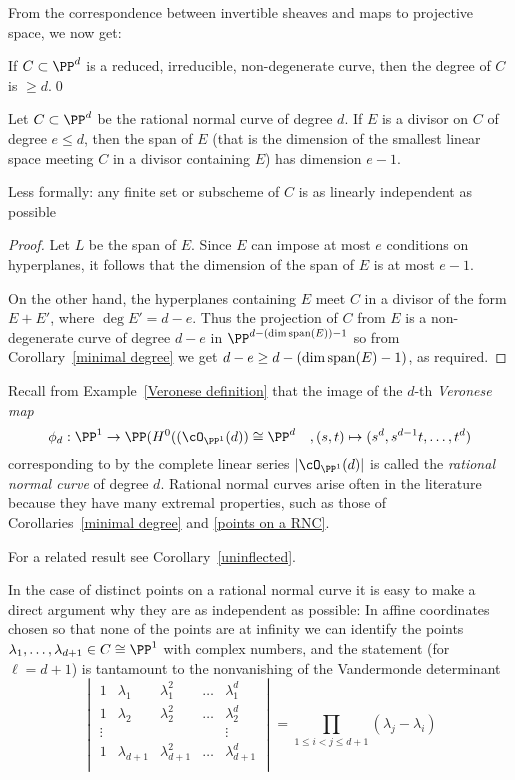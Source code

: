 From the correspondence between invertible sheaves and maps to projective space, we now get:
\begin{corollary}\label{minimal degree}
If $C\subset \PP^d$ is a reduced, irreducible, non-degenerate curve, then the degree of $C$ is $\geq d$.\qed
\end{corollary}

\begin{corollary}\label{independence of points on a RNC}
Let $C\subset \PP^d$ be the rational normal curve of degree $d$. If $E$ is a divisor on $C$ of degree $e\leq d$, then the
span of $E$ (that is the dimension of the smallest linear space meeting $C$ in a divisor containing $E$) has dimension $e-1$.
\end{corollary}
Less formally: any finite set or subscheme of $C$ is as linearly independent as possible

\begin{proof}
Let $L$ be the span of $E$. Since $E$ can impose at most $e$ conditions on hyperplanes, it follows that the dimension of the span of $E$ is
at most $e-1$.

On the other hand, the hyperplanes containing $E$ meet $C$ in a divisor of the form $E+E'$, where
$\deg E' = d-e$. Thus the projection of $C$ from $E$ is a non-degenerate curve of degree $d-e$ in $\PP^{d-(\dim {\rm span}(E))-1}$
so from Corollary~\ref{minimal degree} we get $d-e \geq d-(\dim {\rm span}(E)-1)$, as required.
\end{proof}

Recall from Example~\ref{Veronese definition} that the image of the $d$-th \emph{Veronese map}  
$$
\phi_d: \PP^1 \to \PP(H^0((\cO_{\PP^1}(d)) \cong \PP^d \quad, (s,t) \mapsto (s^d, s^{d-1}t, \dots, t^d)
$$
corresponding to by the complete linear series $|\cO_{\PP^1}(d)|$ is called the \emph{rational normal curve} of degree $d$. Rational normal curves arise often in the literature because they have many extremal properties, such as those of Corollaries~\ref{minimal degree} and \ref{points on a RNC}.

For a related result see Corollary~\ref{uninflected}.

In the case of distinct points on a rational normal curve
it is easy to make a direct argument why they are as independent as possible: In affine coordinates chosen so that none of the points are
at infinity we can identify the points $\lambda_1,\dots,\lambda_{d+1} \in C \cong \PP^1$ with complex numbers, and the statement (for $\ell = d+1$) is tantamount to the nonvanishing of the Vandermonde determinant
$$
\begin{vmatrix}
1 & \lambda_1 & \lambda_1^2 & \dots & \lambda_1^d \\
1 & \lambda_2 & \lambda_2^2 & \dots & \lambda_2^d \\
\vdots & & & & \vdots \\
1 & \lambda_{d+1} & \lambda_{d+1}^2 & \dots & \lambda_{d+1}^d \\
\end{vmatrix}
= \prod_{1 \leq i < j \leq d+1} (\lambda_j - \lambda_i)
$$


